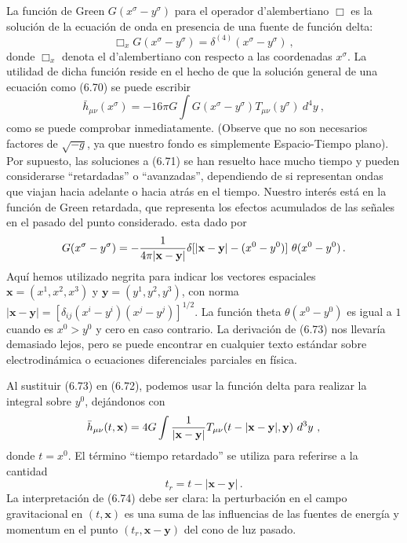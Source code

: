 \documentclass[11pt,b5paper,openany,twoside]{book}
\newcommand{\mn}{{\mu\nu}}
\def\g{{\sqrt{-g}}}
\def\bh{{\bar h}}
\def\x{\mathbf{x}}
\def\y{\mathbf{y}}
\begin{document}
La función de Green $G(x^\sigma - y^\sigma)$ para el operador d'alembertiano $\Box$ es la solución de la ecuación de onda en presencia de una fuente de función delta:
\begin{equation}
{\Box}_x G(x^\sigma - y^\sigma) = \delta^{(4)}(x^\sigma - y^\sigma)
\ ,\label{6.71}
\end{equation}
donde ${\Box}_x$ denota el d'alembertiano con respecto a las coordenadas $x^\sigma$.
La utilidad de dicha función reside en el hecho de que la solución general de una ecuación como (6.70) se puede escribir
\begin{equation}
\bh_\mn(x^\sigma) = -16\pi G \int G(x^\sigma - y^\sigma)T_\mn(y^\sigma)
~d^4y\ ,\label{6.72}
\end{equation}
como se puede comprobar inmediatamente.
(Observe que no son necesarios factores de $\g$, ya que nuestro fondo es simplemente Espacio-Tiempo plano).
Por supuesto, las soluciones a (6.71) se han resuelto hace mucho tiempo y pueden considerarse ``retardadas'' o ``avanzadas'', dependiendo de si representan ondas que viajan hacia adelante o hacia atrás en el tiempo.
Nuestro interés está en la función de Green retardada, que representa los efectos acumulados de las señales en el pasado del punto considerado.
esta dado por
\begin{equation}
G(x^\sigma - y^\sigma) = -{{1}\over{4\pi |\x-\y |}}\delta
[|\x-\y | - (x^0-y^0)] ~\theta(x^0-y^0)\,.\label{6.73}
\end{equation}
Aquí hemos utilizado negrita para indicar los vectores espaciales $\x = (x^1,x^2,x^3)$ y $\y=(y^1,y^2,y^3)$, con norma $|\x-\y |=[\delta_{ij}(x^i-y^i)(x^j-y^j)]^{1/2}$.
La función theta $\theta(x^0-y^0)$ es igual a $1$ cuando es $x^0> y^0$ y cero en caso contrario.
La derivación de (6.73) nos llevaría demasiado lejos, pero se puede encontrar en cualquier texto estándar sobre electrodinámica o ecuaciones diferenciales parciales en física.

Al sustituir (6.73) en (6.72), podemos usar la función delta para realizar la integral sobre $y^0$, dejándonos con
\begin{equation}
\bh_\mn(t,\x) =4G\int {{1}\over {|\x-\y |}}T_\mn(t-|\x-\y |,\y)
~d^3y\ ,\label{6.74}
\end{equation}
donde $t=x^0$.
El término ``tiempo retardado'' se utiliza para referirse a la cantidad
\begin{equation}
t_r = t-|\x-\y |\,.\label{6.75}
\end{equation}
La interpretación de (6.74) debe ser clara: la perturbación en el campo gravitacional en $(t,\x)$ es una suma de las influencias de las fuentes de energía y momentum en el punto $(t_r,\x-\y)$ del cono de luz pasado.
\end{document}

